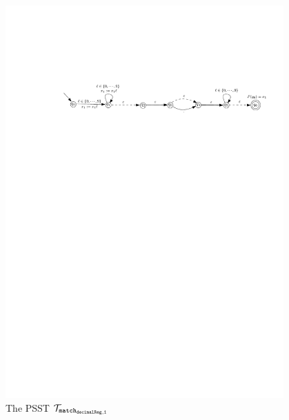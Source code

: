 \begin{example}
\begin{figure}[ht]
\includegraphics[width=0.95\textwidth]{psst-epsilon-exmp-new.pdf}
\caption{The PSST $\mathcal{T}_{\tt match_{decimalReg,1}}$}
\label{fig-psst-exmp}
\end{figure}
\end{example}

  
  




